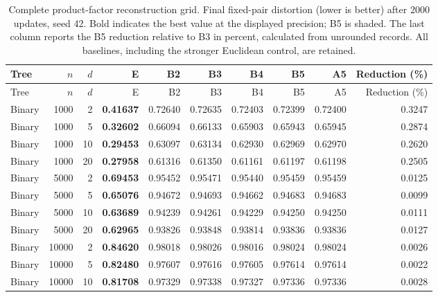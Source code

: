 \begingroup
\footnotesize\setlength{\tabcolsep}{4.2pt}\renewcommand{\arraystretch}{1.12}
\begin{longtable}{lrrrrrrrrr}
\caption{Complete product-factor reconstruction grid. Final fixed-pair distortion (lower is better) after 2000 updates, seed 42. Bold indicates the best value at the displayed precision; B5 is shaded. The last column reports the B5 reduction relative to B3 in percent, calculated from unrounded records. All baselines, including the stronger Euclidean control, are retained.}\label{tab:revision-synthetic-all}\\
\toprule
Tree & $n$ & $d$ & E & B2 & B3 & B4 & B5 & A5 & Reduction (\%) \\
\midrule
\endfirsthead
\toprule
Tree & $n$ & $d$ & E & B2 & B3 & B4 & B5 & A5 & Reduction (\%) \\
\midrule
\endhead
\bottomrule
\endfoot
Binary & 1000 & 2 & \textbf{0.41637} & 0.72640 & 0.72635 & 0.72403 & \cellcolor{oursbg}0.72399 & 0.72400 & 0.3247 \\
Binary & 1000 & 5 & \textbf{0.32602} & 0.66094 & 0.66133 & 0.65903 & \cellcolor{oursbg}0.65943 & 0.65945 & 0.2874 \\
Binary & 1000 & 10 & \textbf{0.29453} & 0.63097 & 0.63134 & 0.62930 & \cellcolor{oursbg}0.62969 & 0.62970 & 0.2620 \\
Binary & 1000 & 20 & \textbf{0.27958} & 0.61316 & 0.61350 & 0.61161 & \cellcolor{oursbg}0.61197 & 0.61198 & 0.2505 \\
Binary & 5000 & 2 & \textbf{0.69453} & 0.95452 & 0.95471 & 0.95440 & \cellcolor{oursbg}0.95459 & 0.95459 & 0.0125 \\
Binary & 5000 & 5 & \textbf{0.65076} & 0.94672 & 0.94693 & 0.94662 & \cellcolor{oursbg}0.94683 & 0.94683 & 0.0099 \\
Binary & 5000 & 10 & \textbf{0.63689} & 0.94239 & 0.94261 & 0.94229 & \cellcolor{oursbg}0.94250 & 0.94250 & 0.0111 \\
Binary & 5000 & 20 & \textbf{0.62965} & 0.93826 & 0.93848 & 0.93814 & \cellcolor{oursbg}0.93836 & 0.93836 & 0.0127 \\
Binary & 10000 & 2 & \textbf{0.84620} & 0.98018 & 0.98026 & 0.98016 & \cellcolor{oursbg}0.98024 & 0.98024 & 0.0026 \\
Binary & 10000 & 5 & \textbf{0.82480} & 0.97607 & 0.97616 & 0.97605 & \cellcolor{oursbg}0.97614 & 0.97614 & 0.0022 \\
Binary & 10000 & 10 & \textbf{0.81708} & 0.97329 & 0.97338 & 0.97327 & \cellcolor{oursbg}0.97336 & 0.97336 & 0.0028 \\

\end{longtable}
